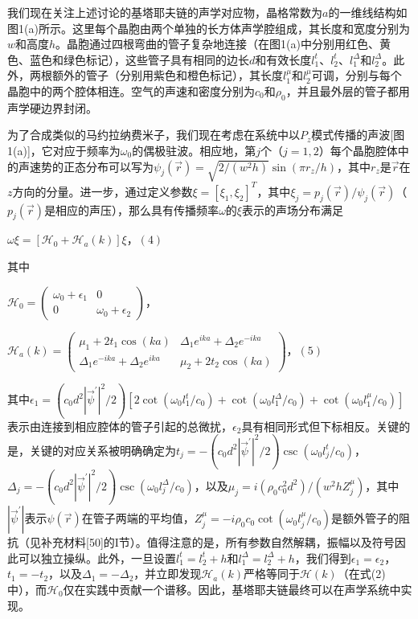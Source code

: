 我们现在关注上述讨论的基塔耶夫链的声学对应物，晶格常数为\(a\)的一维线结构如图1(a)所示。这里每个晶胞由两个单独的长方体声学腔组成，其长度和宽度分别为\(w\)和高度\(h\)。晶胞通过四根弯曲的管子复杂地连接（在图1(a)中分别用红色、黄色、蓝色和绿色标记），这些管子具有相同的边长\(d\)和有效长度\(l_{1}^{t}\)、\(l_{2}^{t}\)、\(l_{1}^{\Delta}\)和\(l_{2}^{\Delta}\)。此外，两根额外的管子（分别用紫色和橙色标记），其长度\(l_{1}^{\mu}\)和\(l_{2}^{\mu}\)可调，分别与每个晶胞中的两个腔体相连。空气的声速和密度分别为\(c_{0}\)和\(\rho_{0}\)，并且最外层的管子都用声学硬边界封闭。

为了合成类似的马约拉纳费米子，我们现在考虑在系统中以\(P_{z}\)模式传播的声波[图1(a)]，它对应于频率为\(\omega_{0}\)的偶极驻波。相应地，第\(j\)个（\(j = 1,2\)）每个晶胞腔体中的声速势的正态分布可以写为\(\psi_{j}(\vec{r}) = \sqrt{2 /(w^{2} h)} \sin(\pi r_{z} / h)\)，其中\(r_{z}\)是\(\vec{r}\)在\(z\)方向的分量。进一步，通过定义参数\(\xi = [\xi_{1}, \xi_{2}]^{T}\)，其中\(\xi_{j} = p_{j}(\vec{r}) / \psi_{j}(\vec{r})\)（\(p_{j}(\vec{r})\)是相应的声压），那么具有传播频率\(\omega\)的\(\xi\)表示的声场分布满足

\(\omega \xi = [\mathcal{H}_{0} + \mathcal{H}_{a}(k)] \xi\)，\((4)\)

其中

\(\mathcal{H}_{0} = \begin{pmatrix} \omega_{0} + \epsilon_{1} & 0 \\ 0 & \omega_{0} + \epsilon_{2} \end{pmatrix}\)，

\(\mathcal{H}_{a}(k) = \begin{pmatrix} \mu_{1} + 2t_{1} \cos(ka) & \Delta_{1} e^{ika} + \Delta_{2} e^{-ika} \\ \Delta_{1} e^{-ika} + \Delta_{2} e^{ika} & \mu_{2} + 2t_{2} \cos(ka) \end{pmatrix}\)，\((5)\)

其中\(\epsilon_{1} = (c_{0} d^{2}|\vec{\psi}^{\prime}|^{2} / 2)[2 \cot(\omega_{0} l_{1}^{t} / c_{0}) + \cot(\omega_{0} l_{1}^{\Delta} / c_{0}) + \cot(\omega_{0} l_{1}^{\mu} / c_{0})]\)表示由连接到相应腔体的管子引起的总微扰，\(\epsilon_{2}\)具有相同形式但下标相反。关键的是，关键的对应关系被明确确定为\(t_{j} = -(c_{0} d^{2}|\vec{\psi}^{\prime}|^{2} / 2) \csc(\omega_{0} l_{j}^{t} / c_{0})\)，\(\Delta_{j} = -(c_{0} d^{2}|\vec{\psi}^{\prime}|^{2} / 2) \csc(\omega_{0} l_{j}^{\Delta} / c_{0})\)，以及\(\mu_{j} = i(\rho_{0} c_{0}^{2} d^{2}) /(w^{2} h Z_{j}^{\mu})\)，其中\(|\vec{\psi}^{\prime}|\)表示\(\psi(\vec{r})\)在管子两端的平均值，\(Z_{j}^{\mu} = -i \rho_{0} c_{0} \cot(\omega_{0} l_{j}^{\mu} / c_{0})\)是额外管子的阻抗（见补充材料[50]的I节）。值得注意的是，所有参数自然解耦，振幅以及符号因此可以独立操纵。此外，一旦设置\(l_{1}^{t} = l_{2}^{t} + h\)和\(l_{1}^{\Delta} = l_{2}^{\Delta} + h\)，我们得到\(\epsilon_{1} = \epsilon_{2}\)，\(t_{1} = -t_{2}\)，以及\(\Delta_{1} = -\Delta_{2}\)，并立即发现\(\mathcal{H}_{a}(k)\)严格等同于\(\mathcal{H}(k)\)（在式(2)中），而\(\mathcal{H}_{0}\)仅在实践中贡献一个谱移。因此，基塔耶夫链最终可以在声学系统中实现。

